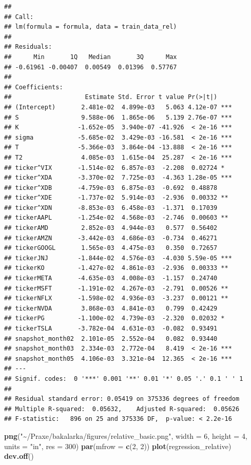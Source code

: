 \documentclass[
]{article}
\newenvironment{Shaded}{\begin{snugshade}}{\end{snugshade}}
\newcommand{\AttributeTok}[1]{\textcolor[rgb]{0.13,0.29,0.53}{#1}}
\newcommand{\DecValTok}[1]{\textcolor[rgb]{0.00,0.00,0.81}{#1}}
\newcommand{\FunctionTok}[1]{\textcolor[rgb]{0.13,0.29,0.53}{\textbf{#1}}}
\newcommand{\NormalTok}[1]{#1}
\newcommand{\StringTok}[1]{\textcolor[rgb]{0.31,0.60,0.02}{#1}}
\begin{document}
\begin{verbatim}
## 
## Call:
## lm(formula = formula, data = train_data_rel)
## 
## Residuals:
##      Min       1Q   Median       3Q      Max 
## -0.61961 -0.00407  0.00549  0.01396  0.57767 
## 
## Coefficients:
##                    Estimate Std. Error t value Pr(>|t|)    
## (Intercept)       2.481e-02  4.899e-03   5.063 4.12e-07 ***
## S                 9.588e-06  1.865e-06   5.139 2.76e-07 ***
## K                -1.652e-05  3.940e-07 -41.926  < 2e-16 ***
## sigma            -5.685e-02  3.429e-03 -16.581  < 2e-16 ***
## T                -5.366e-03  3.864e-04 -13.888  < 2e-16 ***
## T2                4.085e-03  1.615e-04  25.287  < 2e-16 ***
## ticker^VIX       -1.514e-02  6.857e-03  -2.208  0.02724 *  
## ticker^XDA       -3.370e-02  7.725e-03  -4.363 1.28e-05 ***
## ticker^XDB       -4.759e-03  6.875e-03  -0.692  0.48878    
## ticker^XDE       -1.737e-02  5.914e-03  -2.936  0.00332 ** 
## ticker^XDN       -8.853e-03  6.458e-03  -1.371  0.17039    
## tickerAAPL       -1.254e-02  4.568e-03  -2.746  0.00603 ** 
## tickerAMD         2.852e-03  4.944e-03   0.577  0.56402    
## tickerAMZN       -3.442e-03  4.686e-03  -0.734  0.46271    
## tickerGOOGL       1.565e-03  4.475e-03   0.350  0.72657    
## tickerJNJ        -1.844e-02  4.576e-03  -4.030 5.59e-05 ***
## tickerKO         -1.427e-02  4.861e-03  -2.936  0.00333 ** 
## tickerMETA       -4.635e-03  4.008e-03  -1.157  0.24740    
## tickerMSFT       -1.191e-02  4.267e-03  -2.791  0.00526 ** 
## tickerNFLX       -1.598e-02  4.936e-03  -3.237  0.00121 ** 
## tickerNVDA        3.868e-03  4.841e-03   0.799  0.42429    
## tickerPG         -1.100e-02  4.739e-03  -2.320  0.02032 *  
## tickerTSLA       -3.782e-04  4.631e-03  -0.082  0.93491    
## snapshot_month02  2.101e-05  2.552e-04   0.082  0.93440    
## snapshot_month03  2.334e-03  2.772e-04   8.419  < 2e-16 ***
## snapshot_month05  4.106e-03  3.321e-04  12.365  < 2e-16 ***
## ---
## Signif. codes:  0 '***' 0.001 '**' 0.01 '*' 0.05 '.' 0.1 ' ' 1
## 
## Residual standard error: 0.05419 on 375336 degrees of freedom
## Multiple R-squared:  0.05632,    Adjusted R-squared:  0.05626 
## F-statistic:   896 on 25 and 375336 DF,  p-value: < 2.2e-16
\end{verbatim}

\begin{Shaded}
\begin{Highlighting}[]
\FunctionTok{png}\NormalTok{(}\StringTok{"\textasciitilde{}/Praxe/bakalarka/figures/relative\_basic.png"}\NormalTok{, }\AttributeTok{width =} \DecValTok{6}\NormalTok{, }\AttributeTok{height =} \DecValTok{4}\NormalTok{, }\AttributeTok{units =} \StringTok{"in"}\NormalTok{, }\AttributeTok{res =} \DecValTok{300}\NormalTok{)}
\FunctionTok{par}\NormalTok{(}\AttributeTok{mfrow =} \FunctionTok{c}\NormalTok{(}\DecValTok{2}\NormalTok{, }\DecValTok{2}\NormalTok{))}
\FunctionTok{plot}\NormalTok{(regression\_relative)}
\FunctionTok{dev.off}\NormalTok{()}
\end{Highlighting}
\end{Shaded}
\end{document}
